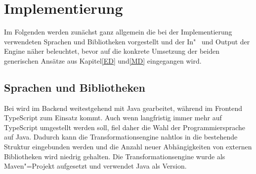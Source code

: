 
\chapter{Implementierung} \label{IM}
Im Folgenden werden zunächst ganz allgemein die bei der Implementierung verwendeten Sprachen und Bibliotheken vorgestellt und der In"~ und Output der Engine näher beleuchtet, bevor auf die konkrete Umsetzung der beiden generischen Ansätze aus Kapitel\nbs\ref{ED} und\nbs\ref{MD} eingegangen wird.

\section{Sprachen und Bibliotheken} \label{IA}

Bei  wird im Backend weitestgehend mit Java gearbeitet, während im Frontend TypeScript zum Einsatz kommt. Auch wenn langfristig immer mehr auf TypeScript umgestellt werden soll, fiel daher die Wahl der Programmiersprache auf Java. Dadurch kann die Transformationsengine nahtlos in die bestehende Struktur eingebunden werden und die Anzahl neuer Abhängigkeiten von externen Bibliotheken wird niedrig gehalten. Die Transformationsengine wurde als Maven"=Projekt aufgesetzt und verwendet Java als Version\nbs\cite[S.--16]{java:lifesci}.

